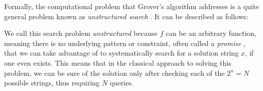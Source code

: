 Formally, the computational problem that Grover's algorithm addresses is a quite general problem known as \emph{unstructured search} \cite{Qiskit2023}. It can be described as follows:
\begin{center}
\end{center}
We call this search problem \emph{unstructured} because $f$ can be an arbitrary function, meaning there is no underlying pattern or constraint, often called a \emph{promise} \cite{Qiskit2023}, that we can take advantage of to systematically search for a solution string $x$, if one even exists. This means that in the classical approach to solving this problem, we can be sure of the solution only after checking each of the $2^n = N$ possible strings, thus requiring $N$ queries. 




\vspace{1.5cm}

